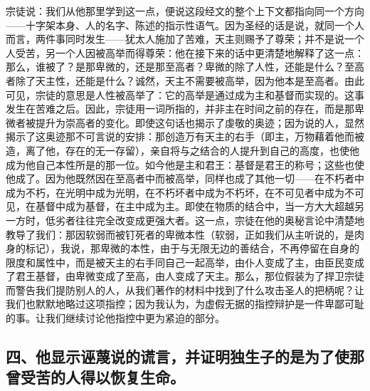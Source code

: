 宗徒说：我们从他那里学到这一点，便说这段经文的整个上下文都指向同一个方向——十字架本身、人的名字、陈述的指示性语气。因为圣经的话是说，就同一个人而言，两件事同时发生——犹太人施加了苦难，天主则赐予了尊荣；并不是说一个人受苦，另一个人因被高举而得尊荣：他在接下来的话中更清楚地解释了这一点：那么，谁被了？是那卑微的，还是那至高者？卑微的除了人性，还能是什么？至高者除了天主性，还能是什么？诚然，天主不需要被高举，因为他本是至高者。由此可见，宗徒的意思是人性被高举了：它的高举是通过成为主和基督而实现的。这事发生在苦难之后。因此，宗徒用一词所指的，并非主在时间之前的存在，而是那卑微者被提升为崇高者的变化。即使这句话也揭示了虔敬的奥迹；因为说的人，显然揭示了这奥迹那不可言说的安排：那创造万有天主的右手（即主，万物藉着他而被造，离了他，存在的无一存留），亲自将与之结合的人提升到自己的高度，也使他成为他自己本性所是的那一位。如今他是主和君王：基督是君王的称号；这些也使他成了。因为他既然因在至高者中而被高举，同样也成了其他一切——在不朽者中成为不朽，在光明中成为光明，在不朽坏者中成为不朽坏，在不可见者中成为不可见，在基督中成为基督，在主中成为主。即使在物质的结合中，当一方大大超越另一方时，低劣者往往完全改变成更强大者。这一点，宗徒在他的奥秘言论中清楚地教导了我们：那因软弱而被钉死者的卑微本性（软弱，正如我们从主听说的，是肉身的标记），我说，那卑微的本性，由于与无限无边的善结合，不再停留在自身的限度和属性中，而是被天主的右手同自己一起高举，由仆人变成了主，由臣民变成了君王基督，由卑微变成了至高，由人变成了天主。那么，那位假装为了捍卫宗徒而警告我们提防别人的人，从我们著作的材料中找到了什么攻击圣人的把柄呢？让我们也默默地略过这项指控；因为我认为，为虚假无据的指控辩护是一件卑鄙可耻的事。让我们继续讨论他指控中更为紧迫的部分。\par


\subsection{四、他显示诬蔑说的谎言，并证明独生子的是为了使那曾受苦的人得以恢复生命。}

